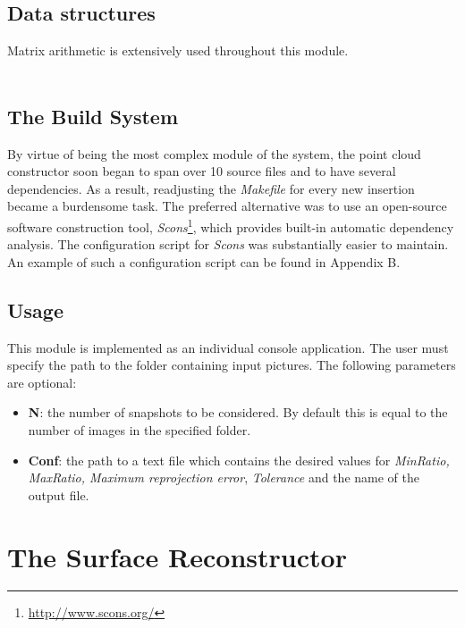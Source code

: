 \documentclass[12pt,a4paper,twoside,openright]{report}
\begin{document}
\subsection{Data structures}
Matrix arithmetic is extensively used throughout this module. \\
\linebreak 
\\
\linebreak 

\subsection{The Build System}
By virtue of being the most complex module of the system, the point cloud constructor soon began to span over 10 source files and to have several dependencies. As a result, readjusting the \emph{Makefile} for every new insertion became a burdensome task. The preferred alternative was to use an open-source software construction tool, \emph{Scons}\footnote{\url{http://www.scons.org/}}, which provides built-in automatic dependency analysis. The configuration script for \emph{Scons} was substantially easier to maintain. An example of such a configuration script can be found in Appendix B.

\subsection{Usage}
This module is implemented as an individual console application. The user must specify the path to the folder containing input pictures. The following parameters are optional:
\begin{itemize}
\item \textbf{N}: the number of snapshots to be considered. By default this is equal to the number of images in the specified folder. 
\item \textbf{Conf}: the path to a text file which contains the desired values for \emph{MinRatio, MaxRatio, Maximum reprojection error}, \emph{Tolerance} and the name of the output file.
\end{itemize}

\section{The Surface Reconstructor}
\end{document}
